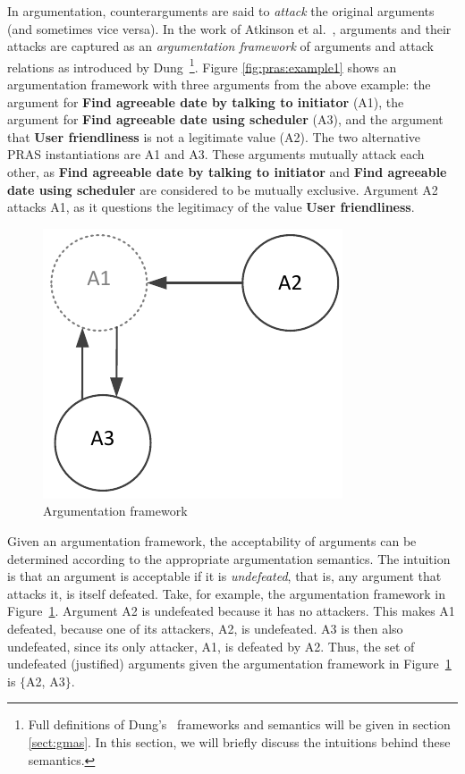 In argumentation, counterarguments are said to \emph{attack} the original arguments (and sometimes vice versa). In the work of Atkinson et al.~\cite{atkinson2007}, arguments and their attacks are captured as an \emph{argumentation framework} of arguments and attack relations as introduced by Dung~\cite{Dung1995}\footnote{Full definitions of Dung's~\cite{Dung1995} frameworks and semantics will be given in section \ref{sect:gmas}. In this section, we will briefly discuss the intuitions behind these semantics.}. Figure \ref{fig:pras:example1} shows an argumentation framework with three arguments from the above example: the argument for \textbf{Find agreeable date by talking to initiator} (A1), the argument for \textbf{Find agreeable date using scheduler} (A3), and the argument that \textbf{User friendliness} is not a legitimate value (A2). The two alternative PRAS instantiations are A1 and A3. These arguments mutually attack each other, as \textbf{Find agreeable date by talking to initiator}  and \textbf{Find agreeable date using scheduler} are considered to be mutually exclusive. Argument A2 attacks A1, as it questions the legitimacy of the value \textbf{User friendliness}. 

\begin{figure}[ht]
\centering
\includegraphics[scale=0.8]{img/Fig1}
\caption{Argumentation framework}
\label{fig:pras:example}
\end{figure}

Given an argumentation framework, the acceptability of arguments can be determined according to the appropriate argumentation semantics. The intuition is that an argument is acceptable if it is \emph{undefeated}, that is, any argument that attacks it, is itself defeated. Take, for example, the argumentation framework in Figure~\ref{fig:pras:example}. Argument A2 is undefeated because it has no attackers. This makes A1 defeated, because one of its attackers, A2, is undefeated. A3 is then also undefeated, since its only attacker, A1, is defeated by A2. Thus, the set of undefeated (justified) arguments given the argumentation framework in Figure~\ref{fig:pras:example} is $\{$A2, A3$\}$. 

